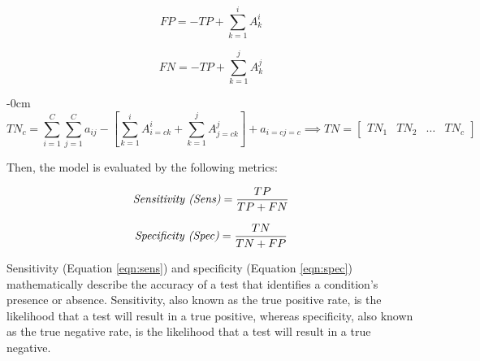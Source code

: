 \documentclass[sensors,article,accept,pdftex,moreauthors]{Definitions/mdpi}
\begin{document}
	\begin{equation}
		\label{eqn:FP}
		FP = -TP + \sum_{k=1}^{i}A^i_k
	\end{equation}
	
	\begin{equation}
		\label{eqn:FN}
		FN = -TP + \sum_{k=1}^{j}A^j_k
	\end{equation}
	

\begin{adjustwidth}{-\extralength}{0cm}
	\begin{equation}
		\label{eqn:TN}
		TN_c = \sum_{i=1}^{C}\sum_{j=1}^{C}a_{ij} - \left[ \sum_{k=1}^{i}A^i_{i=c k} + \sum_{k=1}^{j}A^j_{j=c k} \right] + a_{i=c j=c} \implies TN = \begin{bmatrix}
TN_1 & TN_2 & \dots & TN_c
		\end{bmatrix}
	\end{equation}
\end{adjustwidth}
	
	{Then,} %
 the model is evaluated by the following metrics:
	
	\begin{equation}
		\label{eqn:sens}
		\text{\textit{Sensitivity (Sens)}} = \frac{TP}{TP + FN}
	\end{equation}
	
	\begin{equation}
		\label{eqn:spec}
		\text{\textit{Specificity (Spec)}} = \frac{TN}{TN + FP}
	\end{equation}
	
	{{Sensitivity (Equation \mbox{\eqref{eqn:sens}}) and specificity (Equation \mbox{\eqref{eqn:spec}}) mathematically describe the accuracy of a test that identifies a condition's presence or absence. Sensitivity, also known as the true positive rate, is the likelihood that a test will result in a true positive, whereas specificity, also known as the true negative rate, is the likelihood that a test will result in a true negative.}}
	
\end{document}
